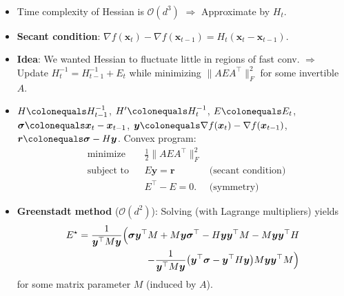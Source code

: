 \documentclass[8pt,a4paper]{extarticle}
\newcommand{\lft}{\mathopen{}\mathclose\bgroup\left}
\newcommand{\rgt}{\aftergroup\egroup\right}
\renewcommand{\vec}[1]{\bm{#1}}
\newcommand{\mat}[1]{#1}
\newenvironment{topic}[1]
{\textbf{\sffamily \colorbox{black}{\rlap{\textbf{\textcolor{white}{#1}}}\hspace{\linewidth}\hspace{-2\fboxsep}}} \\ \vspace{0.2cm}}
{}
\begin{document}
\begin{multicols*}{2}
    \begin{topic}{Quasi-Newton methods}
        \begin{itemize}
            \item Time complexity of Hessian is $\mathcal{O}(d^3)$ $\Rightarrow$ Approximate by $\mat{H}_t$.
            \item \textbf{Secant condition}: $\nabla f(\vec{x}_t) - \nabla f(\vec{x}_{t-1}) = H_t (\vec{x}_t - \vec{x}_{t-1})$.
            \item \textbf{Idea}: We wanted Hessian to fluctuate little in regions of fast conv. $\Rightarrow$ Update $\mat{H}_t^{-1} = \mat{H}_{t-1}^{-1} + \mat{E}_t$ while minimizing $\| \mat{A} \mat{E} \mat{A}^\top \|_F^2$ for some invertible $\mat{A}$.
            \item $\mat{H} \colonequals \mat{H}_{t-1}^{-1}$, $\mat{H}' \colonequals \mat{H}_t^{-1}$, $\mat{E} \colonequals \mat{E}_t$, $\vec{\sigma} \colonequals \vec{x}_t - \vec{x}_{t-1}$, $\vec{y} \colonequals \nabla f(\vec{x}_t) - \nabla f(\vec{x}_{t-1})$, $\vec{r} \colonequals \vec{\sigma} - \mat{H} \vec{y}$. Convex program:
                  \begin{align*}
                       & \text{minimize}   &  & \frac{1}{2} \| \mat{A} \mat{E} \mat{A}^\top \|_F^2                             \\
                       & \text{subject to} &  & \mat{E} \vec{y} = \vec{r}                          & \text{(secant condition)} \\
                       &                   &  & \mat{E}^\top - \mat{E} = \mat{0}.                  & \text{(symmetry)}
                  \end{align*}
            \item \textbf{Greenstadt method} ($\mathcal{O}(d^2)$): Solving (with Lagrange multipliers) yields
                  \begin{align*}
                      \mat{E}^\star = \frac{1}{\vec{y}^\top \mat{M} \vec{y}} \Big( \vec{\sigma} \vec{y}^\top \mat{M} + \mat{M} \vec{y} \vec{\sigma}^\top - \mat{H} \vec{y} \vec{y}^\top \mat{M} - \mat{M} \vec{y} \vec{y}^\top \mat{H} & \\
                      - \frac{1}{\vec{y}^\top \mat{M} \vec{y}} \lft( \vec{y}^\top \vec{\sigma} - \vec{y}^\top \mat{H} \vec{y} \rgt) \mat{M} \vec{y} \vec{y}^\top \mat{M} \Big)                                                         &
                  \end{align*}
                  for some matrix parameter $\mat{M}$ (induced by $\mat{A}$).

\end{itemize}
\end{topic}
\end{multicols*}
\end{document}
